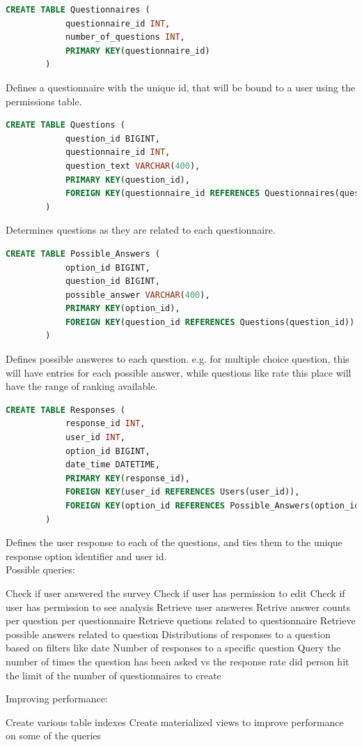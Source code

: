 \documentclass[12pt, oneside, a4paper]{article}
\begin{document}
    \begin{lstlisting}[language=SQL, columns=flexible]
        CREATE TABLE Questionnaires (
            questionnaire_id INT,
            number_of_questions INT, 
            PRIMARY KEY(questionnaire_id)
        ) 
    \end{lstlisting}
    Defines a questionnaire with the unique id, that will be bound to a user using the permissions table. 
    \\

    \begin{lstlisting}[language=SQL, columns=flexible]
        CREATE TABLE Questions (
            question_id BIGINT,
            questionnaire_id INT,
            question_text VARCHAR(400), 
            PRIMARY KEY(question_id),
            FOREIGN KEY(questionnaire_id REFERENCES Questionnaires(questionnaire_id))
        ) 
    \end{lstlisting}
    Determines questions as they are related to each questionnaire. 
    \\

    \begin{lstlisting}[language=SQL, columns=flexible]
        CREATE TABLE Possible_Answers (
            option_id BIGINT,
            question_id BIGINT, 
            possible_answer VARCHAR(400),
            PRIMARY KEY(option_id),
            FOREIGN KEY(question_id REFERENCES Questions(question_id))
        ) 
    \end{lstlisting}
    Defines possible answeres to each question. e.g. for multiple choice question, this will have entries for each possible answer, while questions like rate this place will have the range of ranking available. 
    \\

    \begin{lstlisting}[language=SQL, columns=flexible]
        CREATE TABLE Responses (
            response_id INT,
            user_id INT,
            option_id BIGINT, 
            date_time DATETIME,
            PRIMARY KEY(response_id),
            FOREIGN KEY(user_id REFERENCES Users(user_id)), 
            FOREIGN KEY(option_id REFERENCES Possible_Answers(option_id))
        ) 
    \end{lstlisting}
    Defines the user response to each of the questions, and ties them to the unique response option identifier and user id.
    \\

    Possible queries: 
    \begin{outline}
        \1 Check if user answered the survey
        \1 Check if user has permission to edit 
        \1 Check if user has permission to see analysis
        \1 Retrieve user answeres
        \1 Retrive answer counts per question per questionnaire
        \1 Retrieve quetions related to questionnaire
        \1 Retrieve possible answers related to question
        \1 Distributions of responses to a question based on filters like date
        \1 Number of responses to a specific question
        \1 Query the number of times the question has been asked vs the response rate
        \1 did person hit the limit of the number of questionnaires to create
    \end{outline}
    
    Improving performance:
    \begin{outline}
        \1 Create various table indexes
        \1 Create materialized views to improve performance on some of the queries
    \end{outline}
\end{document}
